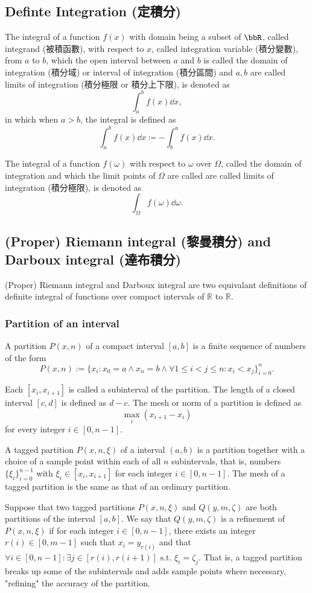 \documentclass[a4paper,12pt]{report}
\begin{document}
\begin{itemize}
\begin{itemize}
\section{Definte Integration (定積分)}
The integral of a function $f(x)$ with domain being a subset of $\bbR$, called integrand (被積函數), with respect to $x$, called integration variable (積分變數), from $a$ to $b$, which the open interval between $a$ and $b$ is called the domain of integration (積分域) or interval of integration (積分區間) and $a,b$ are called limits of integration (積分極限 or 積分上下限), is denoted as
\[\int_a^bf(x)\dd{x},\]
in which when $a>b$, the integral is defined as
\[\int_a^bf(x)\dd{x}\coloneq-\int_b^af(x)\dd{x}.\]

The integral of a function $f(\omega)$ with respect to $\omega$ over $\Omega$, called the domain of integration and which the limit points of $\Omega$ are called are called limits of integration (積分極限), is denoted as
\[\int_{\Omega}f(\omega)\dd{\omega}.\]
\subsection{(Proper) Riemann integral (黎曼積分) and Darboux integral (達布積分)}
(Proper) Riemann integral and Darboux integral are two equivalant definitions of definite integral of functions over compact intervals of $\mathbb{R}$ to $\mathbb{R}$.
\subsubsection{Partition of an interval}
A partition $P(x, n)$ of a compact interval $[a,b]$ is a finite sequence of numbers of the form
\[P(x, n):=\{x_i\colon x_0=a\land x_n=b\land\forall 1\leq i<j\leq n\colon x_i<x_j\}_{i=0}^n.\]

Each $[x_i, x_{i+1}]$ is called a subinterval of the partition. The length of a closed interval $[c,d]$ is defined as $d-c$. The mesh or norm of a partition is defined as
\[\max_i\left(x_{i+1}-x_{i}\right)\]
for every integer $i\in [0,n-1]$.

A tagged partition $P(x,n,\xi)$ of a interval $(a,b)$ is a partition together with a choice of a sample point within each of all $n$ subintervals, that is, numbers $\{\xi_i\}_{i=0}^{n-1}$ with $\xi_i\in [x_i,x_{i+1}]$ for each integer $i\in [0,n-1]$. The mesh of a tagged partition is the same as that of an ordinary partition.

Suppose that two tagged partitions $P(x,n,\xi)$ and $Q(y,m,\zeta)$ are both partitions of the interval $[a,b]$. We say that $Q(y,m,\zeta)$ is a refinement of $P(x,n,\xi)$ if for each integer $i\in [0,n-1]$, there exists an integer $r(i)\in [0,m-1]$ such that $x_i = y_{r(i)}$ and that $\forall i\in [0,n-1]\colon\exists j\in [r(i),r(i + 1)] \text{\ s.t.\ }\xi_i = \zeta_j$. That is, a tagged partition breaks up some of the subintervals and adds sample points where necessary, "refining" the accuracy of the partition.


\end{itemize}
\end{itemize}
\end{document}

